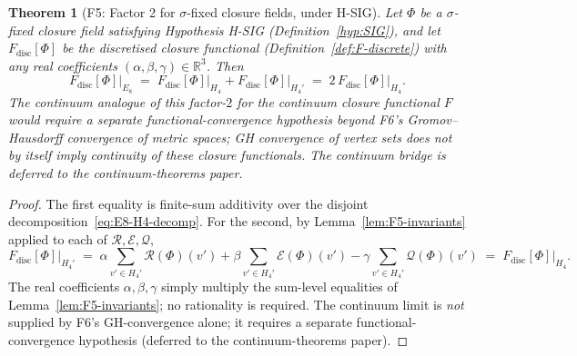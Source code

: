 \documentclass[12pt]{article}
\newtheorem{theorem}{Theorem}
\theoremstyle{definition}
\theoremstyle{remark}
\begin{document}
\begin{theorem}[F5: Factor 2 for $\sigma$-fixed closure fields, under H-SIG]\label{thm:F5}
Let $\Phi$ be a $\sigma$-fixed closure field satisfying Hypothesis H-SIG (Definition~\ref{hyp:SIG}), and let $F_{\mathrm{disc}}[\Phi]$ be the discretised closure functional (Definition~\ref{def:F-discrete}) with any real coefficients $(\alpha, \beta, \gamma) \in \mathbb{R}^3$. Then
\begin{equation}\label{eq:factor-2}
F_{\mathrm{disc}}[\Phi]\bigr|_{E_8} \;=\; F_{\mathrm{disc}}[\Phi]\bigr|_{H_4} + F_{\mathrm{disc}}[\Phi]\bigr|_{H_4'} \;=\; 2\,F_{\mathrm{disc}}[\Phi]\bigr|_{H_4}.
\end{equation}
The continuum analogue of this factor-$2$ for the continuum closure functional $F$ would require a separate functional-convergence hypothesis beyond F6's Gromov--Hausdorff convergence of metric spaces; GH convergence of vertex sets does not by itself imply continuity of these closure functionals. The continuum bridge is deferred to the continuum-theorems paper.
\end{theorem}

\begin{proof}
The first equality is finite-sum additivity over the disjoint decomposition~\eqref{eq:E8-H4-decomp}. For the second, by Lemma~\ref{lem:F5-invariants} applied to each of $\mathcal R, \mathcal E, \mathcal Q$,
\begin{equation}
F_{\mathrm{disc}}[\Phi]\bigr|_{H_4'} \;=\; \alpha \!\sum_{v' \in H_4'}\! \mathcal R(\Phi)(v') + \beta \!\sum_{v' \in H_4'}\! \mathcal E(\Phi)(v') - \gamma \!\sum_{v' \in H_4'}\! \mathcal Q(\Phi)(v') \;=\; F_{\mathrm{disc}}[\Phi]\bigr|_{H_4}.
\end{equation}
The real coefficients $\alpha, \beta, \gamma$ simply multiply the sum-level equalities of Lemma~\ref{lem:F5-invariants}; no rationality is required. The continuum limit is \emph{not} supplied by F6's GH-convergence alone; it requires a separate functional-convergence hypothesis (deferred to the continuum-theorems paper).
\end{proof}
\end{document}

